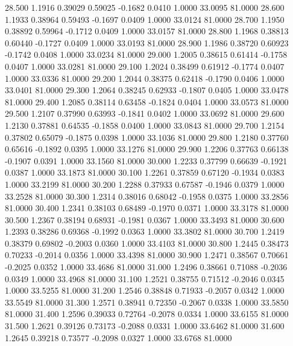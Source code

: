   28.500   1.1916   0.39029   0.59025  -0.1682   0.0410   1.0000  33.0095  81.0000
  28.600   1.1933   0.38964   0.59493  -0.1697   0.0409   1.0000  33.0124  81.0000
  28.700   1.1950   0.38892   0.59964  -0.1712   0.0409   1.0000  33.0157  81.0000
  28.800   1.1968   0.38813   0.60440  -0.1727   0.0409   1.0000  33.0193  81.0000
  28.900   1.1986   0.38720   0.60923  -0.1742   0.0408   1.0000  33.0234  81.0000
  29.000   1.2005   0.38615   0.61414  -0.1758   0.0407   1.0000  33.0281  81.0000
  29.100   1.2024   0.38499   0.61912  -0.1774   0.0407   1.0000  33.0336  81.0000
  29.200   1.2044   0.38375   0.62418  -0.1790   0.0406   1.0000  33.0401  81.0000
  29.300   1.2064   0.38245   0.62933  -0.1807   0.0405   1.0000  33.0478  81.0000
  29.400   1.2085   0.38114   0.63458  -0.1824   0.0404   1.0000  33.0573  81.0000
  29.500   1.2107   0.37990   0.63993  -0.1841   0.0402   1.0000  33.0692  81.0000
  29.600   1.2130   0.37881   0.64535  -0.1858   0.0400   1.0000  33.0843  81.0000
  29.700   1.2154   0.37802   0.65079  -0.1875   0.0398   1.0000  33.1036  81.0000
  29.800   1.2180   0.37760   0.65616  -0.1892   0.0395   1.0000  33.1276  81.0000
  29.900   1.2206   0.37763   0.66138  -0.1907   0.0391   1.0000  33.1560  81.0000
  30.000   1.2233   0.37799   0.66639  -0.1921   0.0387   1.0000  33.1873  81.0000
  30.100   1.2261   0.37859   0.67120  -0.1934   0.0383   1.0000  33.2199  81.0000
  30.200   1.2288   0.37933   0.67587  -0.1946   0.0379   1.0000  33.2528  81.0000
  30.300   1.2314   0.38016   0.68042  -0.1958   0.0375   1.0000  33.2856  81.0000
  30.400   1.2341   0.38103   0.68489  -0.1970   0.0371   1.0000  33.3178  81.0000
  30.500   1.2367   0.38194   0.68931  -0.1981   0.0367   1.0000  33.3493  81.0000
  30.600   1.2393   0.38286   0.69368  -0.1992   0.0363   1.0000  33.3802  81.0000
  30.700   1.2419   0.38379   0.69802  -0.2003   0.0360   1.0000  33.4103  81.0000
  30.800   1.2445   0.38473   0.70233  -0.2014   0.0356   1.0000  33.4398  81.0000
  30.900   1.2471   0.38567   0.70661  -0.2025   0.0352   1.0000  33.4686  81.0000
  31.000   1.2496   0.38661   0.71088  -0.2036   0.0349   1.0000  33.4968  81.0000
  31.100   1.2521   0.38755   0.71512  -0.2046   0.0345   1.0000  33.5255  81.0000
  31.200   1.2546   0.38848   0.71933  -0.2057   0.0342   1.0000  33.5549  81.0000
  31.300   1.2571   0.38941   0.72350  -0.2067   0.0338   1.0000  33.5850  81.0000
  31.400   1.2596   0.39033   0.72764  -0.2078   0.0334   1.0000  33.6155  81.0000
  31.500   1.2621   0.39126   0.73173  -0.2088   0.0331   1.0000  33.6462  81.0000
  31.600   1.2645   0.39218   0.73577  -0.2098   0.0327   1.0000  33.6768  81.0000
